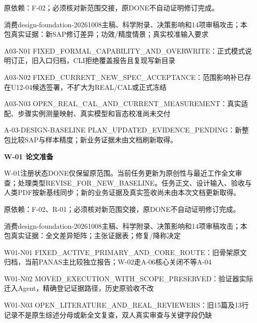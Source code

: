 \documentclass[11pt,a4paper]{article}
\newcommand{\reviewsection}[1]{\par\Needspace{5\baselineskip}\vspace{10pt}\begin{center}{\titlelatin\titlecjk\bfseries\fontsize{14}{20}\selectfont #1}\end{center}}
\begin{document}
原依赖：F-\allowbreak{}02；必须核对新范围交接，原DONE不自动证明修订完成。


消费design-\allowbreak{}foundation-\allowbreak{}20261008主稿、科学附录、决策影响和14项审稿攻击；本包真实证据：新SAP修订差异；功效/\allowbreak{}精度情景；真实校准输入要求


A03-\allowbreak{}N01 FIXED\_\allowbreak{}FORMAL\_\allowbreak{}CAPABILITY\_\allowbreak{}AND\_\allowbreak{}OVERWRITE：正式模式说明订正，旧入口归档，CLI拒绝覆盖报告且复现写新目录


A03-\allowbreak{}N02 FIXED\_\allowbreak{}CURRENT\_\allowbreak{}NEW\_\allowbreak{}SPEC\_\allowbreak{}ACCEPTANCE：范围影响补已存在U12-\allowbreak{}04候选签署，不扩大为REAL/\allowbreak{}CAL或正式冻结


A03-\allowbreak{}N03 OPEN\_\allowbreak{}REAL\_\allowbreak{}CAL\_\allowbreak{}AND\_\allowbreak{}CURRENT\_\allowbreak{}MEASUREMENT：真实适配、步骤实例测量映射、真实模型和盲态校准尚未交付


A-\allowbreak{}03-\allowbreak{}DESIGN-\allowbreak{}BASELINE PLAN\_\allowbreak{}UPDATED\_\allowbreak{}EVIDENCE\_\allowbreak{}PENDING：新整包比较SAP与样本精度；新业务证据未由文档刷新取得。


\reviewsection{W-\allowbreak{}01 论文准备}
W-\allowbreak{}01注册状态DONE仅保留原范围。当前任务更新为原创性与最近工作全文审查；处理类型REVISE\_\allowbreak{}FOR\_\allowbreak{}NEW\_\allowbreak{}BASELINE。任务正文、设计输入、验收与人类PDF按新基线同步；新的业务证据及真实签收尚未由本次文档更新取得。


原依赖：F-\allowbreak{}02、R-\allowbreak{}01；必须核对新范围交接，原DONE不自动证明修订完成。


消费design-\allowbreak{}foundation-\allowbreak{}20261008主稿、科学附录、决策影响和14项审稿攻击；本包真实证据：全文差异矩阵；主张证据表；修复/\allowbreak{}降称决定


W01-\allowbreak{}N01 FIXED\_\allowbreak{}ACTIVE\_\allowbreak{}PRIMARY\_\allowbreak{}AND\_\allowbreak{}CORE\_\allowbreak{}ROUTE：旧骨架原文归档，当前PANAS主比较独立报告；W-\allowbreak{}02走A-\allowbreak{}06核心关闭不等A-\allowbreak{}04


W01-\allowbreak{}N02 MOVED\_\allowbreak{}EXECUTION\_\allowbreak{}WITH\_\allowbreak{}SCOPE\_\allowbreak{}PRESERVED：验证器实际迁入Agent，精确登记证据路径，历史原验收不改


W01-\allowbreak{}N03 OPEN\_\allowbreak{}LITERATURE\_\allowbreak{}AND\_\allowbreak{}REAL\_\allowbreak{}REVIEWERS：旧15篇及13行记录不是原生综述分母或新全文复查，双人真实审查与关键字段仍缺
\end{document}
